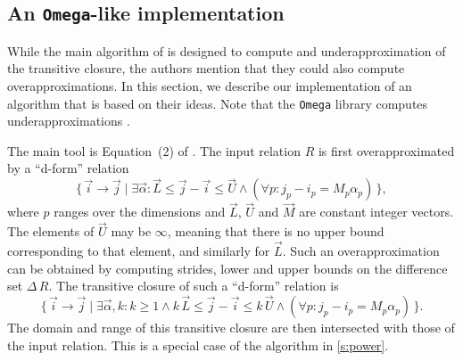 \subsection{An {\tt Omega}-like implementation}

While the main algorithm of  is
designed to compute and underapproximation of the transitive closure,
the authors mention that they could also compute overapproximations.
In this section, we describe our implementation of an algorithm
that is based on their ideas.
Note that the {\tt Omega} library computes underapproximations
.

The main tool is Equation~(2) of .
The input relation $R$ is first overapproximated by a ``d-form'' relation
$$
\{\, \vec i \to \vec j \mid \exists \vec \alpha :
\vec L \le \vec j - \vec i \le \vec U
\wedge
(\forall p : j_p - i_p = M_p \alpha_p)
\,\}
,
$$
where $p$ ranges over the dimensions and $\vec L$, $\vec U$ and
$\vec M$ are constant integer vectors.  The elements of $\vec U$
may be $\infty$, meaning that there is no upper bound corresponding
to that element, and similarly for $\vec L$.
Such an overapproximation can be obtained by computing strides,
lower and upper bounds on the difference set $\Delta \, R$.
The transitive closure of such a ``d-form'' relation is
\begin{equation}
\label{eq:omega}
\{\, \vec i \to \vec j \mid \exists \vec \alpha, k :
k \ge 1 \wedge
k \, \vec L \le \vec j - \vec i \le k \, \vec U
\wedge
(\forall p : j_p - i_p = M_p \alpha_p)
\,\}
.
\end{equation}
The domain and range of this transitive closure are then
intersected with those of the input relation.
This is a special case of the algorithm in \autoref{s:power}.

